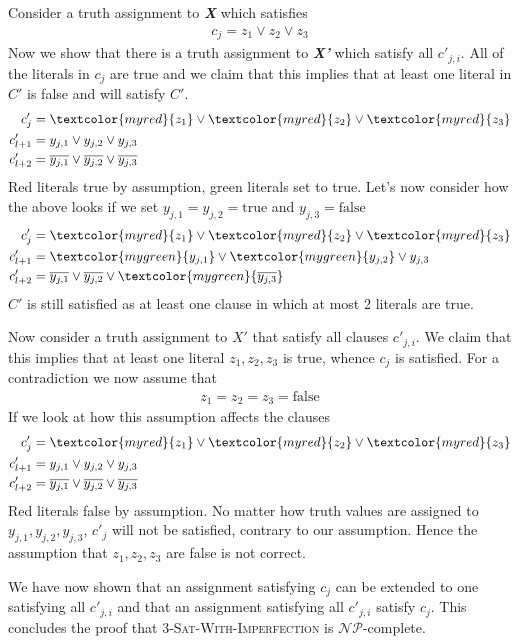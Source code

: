 Consider a truth assignment to \textit{\textbf{X}} which satisfies
\begin{align*}
	c_j = z_1 \lor z_2 \lor z_3
\end{align*}
Now we show that there is a truth assignment to \textit{\textbf{X'}} which satisfy all $c'_{j,i}$. All of the literals in $c_j$ are true and we claim that this implies that at least one literal in $C'$ is false and will satisfy $C'$.
\begin{align*}
	c'_{j} &= \textcolor{myred}{z_1} \lor \textcolor{myred}{z_2} \lor \textcolor{myred}{z_3} \\
	c'_{l+1} &= y_{j,1} \lor y_{j,2} \lor y_{j,3} \\
	c'_{l+2} &= \overline{y_{j,1}} \lor \overline{y_{j,2}} \lor \overline{y_{j,3}}
\end{align*}
\textcolor{myred}{Red} literals true by assumption, \textcolor{mygreen}{green} literals set to true.
Let's now consider how the above looks if we set $y_{j,1} = y_{j,2} = \text{true}$ and $y_{j,3} = \text{false}$
\begin{align*}
	c'_{j} &= \textcolor{myred}{z_1} \lor \textcolor{myred}{z_2} \lor \textcolor{myred}{z_3} \\
	c'_{l+1} &= \textcolor{mygreen}{y_{j,1}} \lor \textcolor{mygreen}{y_{j,2}} \lor y_{j,3} \\
	c'_{l+2} &= \overline{y_{j,1}} \lor \overline{y_{j,2}} \lor \textcolor{mygreen}{\overline{y_{j,3}}}
\end{align*}
$C'$ is still satisfied as at least one clause in which at most 2 literals are true.

Now consider a truth assignment to $X'$ that satisfy all clauses $c'_{j,i}$. We claim that this implies that at least one literal $z_1, z_2, z_3$ is true, whence $c_j$ is satisfied. For a contradiction we now assume that
\begin{align*}
	z_1 = z_2 = z_3 = \text{false}
\end{align*}
If we look at how this assumption affects the clauses 
\begin{align*}
	c'_{j} &= \textcolor{myred}{z_1} \lor \textcolor{myred}{z_2} \lor \textcolor{myred}{z_3} \\
	c'_{l+1} &= y_{j,1} \lor y_{j,2} \lor y_{j,3} \\
	c'_{l+2} &= \overline{y_{j,1}} \lor \overline{y_{j,2}} \lor \overline{y_{j,3}}
\end{align*}
\textcolor{myred}{Red} literals false by assumption. No matter how truth values are assigned to $y_{j,1}, y_{j,2}, y_{j,3}$, $c'_j$ will not be satisfied, contrary to our assumption. Hence the assumption that $z_1, z_2, z_3$ are false is not correct.

We have now shown that an assignment satisfying $c_j$ can be extended to one satisfying all $c'_{j,i}$ and that an assignment satisfying all $c'_{j,i}$ satisfy $c_j$. This concludes the proof that \textsc{3-Sat-With-Imperfection} is $\mathcal{NP}$-complete.